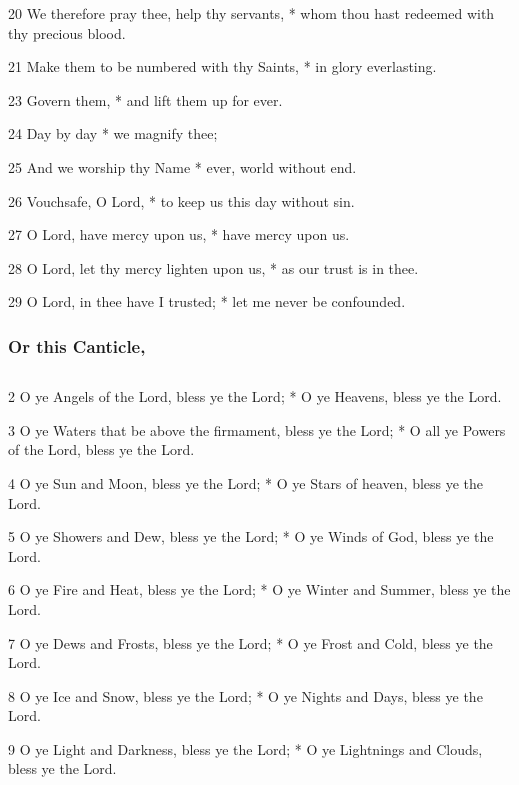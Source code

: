 20 We therefore pray thee, help thy servants, * whom thou hast redeemed with thy precious blood.

21 Make them to be numbered with thy Saints, * in glory everlasting.



23 Govern them, * and lift them up for ever.

24 Day by day * we magnify thee;

25 And we worship thy Name * ever, world without end.

26 Vouchsafe, O Lord, * to keep us this day without sin.

27 O Lord, have mercy upon us, * have mercy upon us.

28 O Lord, let thy mercy lighten upon us, * as our trust is in thee.

29 O Lord, in thee have I trusted; * let me never be confounded.

\subsubsection{Or this Canticle,}

\subsection{}


2 O ye Angels of the Lord, bless ye the Lord; * O ye Heavens, bless ye the Lord.

3 O ye Waters that be above the firmament, bless ye the Lord; * O all ye Powers of the Lord, bless ye the Lord.

4 O ye Sun and Moon, bless ye the Lord; * O ye Stars of heaven, bless ye the Lord.

5 O ye Showers and Dew, bless ye the Lord; * O ye Winds of God, bless ye the Lord.

6 O ye Fire and Heat, bless ye the Lord; * O ye Winter and Summer, bless ye the Lord.

7 O ye Dews and Frosts, bless ye the Lord; * O ye Frost and Cold, bless ye the Lord.

8 O ye Ice and Snow, bless ye the Lord; * O ye Nights and Days, bless ye the Lord.

9 O ye Light and Darkness, bless ye the Lord; * O ye Lightnings and Clouds, bless ye the Lord.

